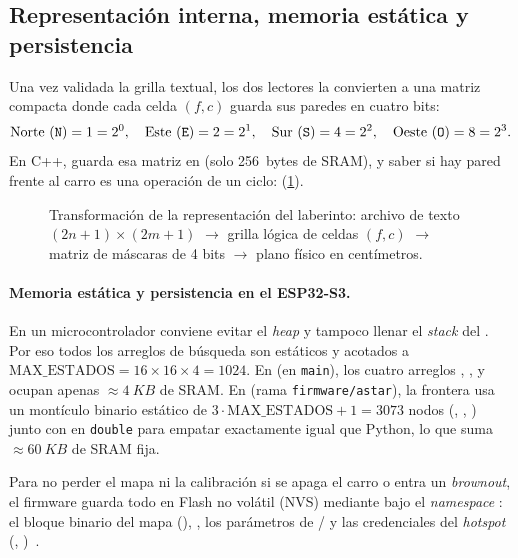 \subsection{Representación interna, memoria estática y persistencia}
\label{subsec:repr-interna-memoria}

Una vez validada la grilla textual, los dos lectores la convierten a una matriz compacta donde cada celda $(f, c)$ guarda sus paredes en cuatro bits:
\[
  \text{Norte } (\texttt{N}) = 1 = 2^0, \quad
  \text{Este } (\texttt{E}) = 2 = 2^1, \quad
  \text{Sur } (\texttt{S}) = 4 = 2^2, \quad
  \text{Oeste } (\texttt{O}) = 8 = 2^3.
\]
En C++,  guarda esa matriz en  (solo \SI{256}{bytes} de SRAM), y saber si hay pared frente al carro es una operación de un ciclo:  (\cref{fig:grilla-bitmask}).

\begin{figure}[H]
\centering

\caption{Transformación de la representación del laberinto: archivo de texto $(2n+1)\times(2m+1)$ $\rightarrow$ grilla lógica de celdas $(f,c)$ $\rightarrow$ matriz de máscaras de 4 bits $\rightarrow$ plano físico en centímetros.}
\label{fig:grilla-bitmask}
\end{figure}

\paragraph{Memoria estática y persistencia en el ESP32-S3.}
En un microcontrolador conviene evitar el \textit{heap} y tampoco llenar el \textit{stack} del . Por eso todos los arreglos de búsqueda son estáticos y acotados a $\text{MAX\_ESTADOS} = 16 \times 16 \times 4 = 1024$. En  (en \texttt{main}), los cuatro arreglos , ,  y  ocupan apenas $\approx\SI{4}{KB}$ de SRAM. En  (rama \texttt{firmware/astar}), la frontera usa un montículo binario estático de $3\cdot\text{MAX\_ESTADOS}+1 = 3073$ nodos (, , ) junto con  en \texttt{double} para empatar exactamente igual que Python, lo que suma $\approx\SI{60}{KB}$ de SRAM fija.

Para no perder el mapa ni la calibración si se apaga el carro o entra un \textit{brownout}, el firmware guarda todo en Flash no volátil (NVS) mediante  bajo el \textit{namespace} : el bloque binario del mapa (), , los parámetros de / y las credenciales del \textit{hotspot} (, )~\cite{arquitectura2026doc}.

